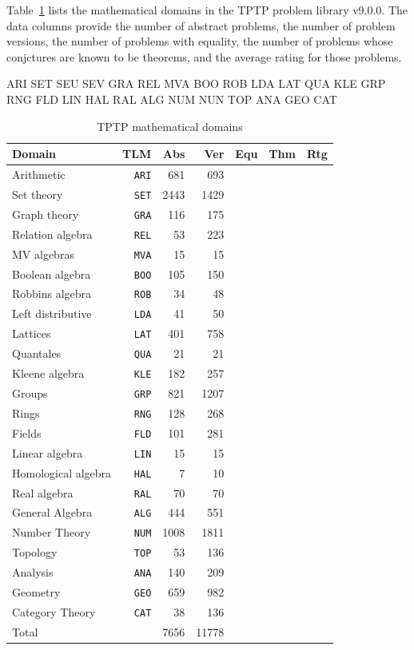 \documentclass[runningheads]{llncs}
\begin{document}
Table~\ref{Domains} lists the mathematical domains in the TPTP problem library v9.0.0.
The data columns provide the number of abstract problems, the number of problem versions, the
number of problems with equality, the number of problems whose conjctures are known to be
theorems, and the average rating for those problems.

ARI SET SEU SEV GRA REL MVA BOO ROB LDA LAT QUA KLE GRP RNG FLD LIN HAL RAL ALG NUM NUN TOP ANA GEO CAT

\begin{table}[htb]
\begin{center}
\setlength{\tabcolsep}{4pt}
\begin{tabular}{lr|rr|rrr}
Domain              & TLM       & Abs  & Ver  & Equ & Thm & Rtg \\
\hline
Arithmetic          & {\tt ARI} &  681 &  693 & & & \\
Set theory          & {\tt SET} & 2443 & 1429 & & & \\
Graph theory        & {\tt GRA} &  116 &  175 & & & \\
Relation algebra    & {\tt REL} &   53 &  223 & & & \\
MV algebras         & {\tt MVA} &   15 &   15 & & & \\
Boolean algebra     & {\tt BOO} &  105 &  150 & & & \\
Robbins algebra     & {\tt ROB} &   34 &   48 & & & \\
Left distributive   & {\tt LDA} &   41 &   50 & & & \\
Lattices            & {\tt LAT} &  401 &  758 & & & \\
Quantales           & {\tt QUA} &   21 &   21 & & & \\
Kleene algebra      & {\tt KLE} &  182 &  257 & & & \\
Groups              & {\tt GRP} &  821 & 1207 & & & \\
Rings               & {\tt RNG} &  128 &  268 & & & \\
Fields              & {\tt FLD} &  101 &  281 & & & \\
Linear algebra      & {\tt LIN} &   15 &   15 & & & \\
Homological algebra & {\tt HAL} &    7 &   10 & & & \\
Real algebra        & {\tt RAL} &   70 &   70 & & & \\
General Algebra     & {\tt ALG} &  444 &  551 & & & \\
Number Theory       & {\tt NUM} & 1008 & 1811 & & & \\
Topology            & {\tt TOP} &   53 &  136 & & & \\
Analysis            & {\tt ANA} &  140 &  209 & & & \\
Geometry            & {\tt GEO} &  659 &  982 & & & \\
Category Theory     & {\tt CAT} &   38 &  136 & & & \\
\hline
Total               &           & 7656 &11778 & & & \\
\end{tabular}
\end{center}
\caption{TPTP mathematical domains}
\label{Domains}
\end{table}
\end{document}
